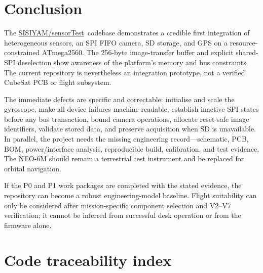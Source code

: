 \documentclass[11pt,a4paper]{article}
\newcommand{\repo}{\href{https://github.com/SISIYAM/sensorTest}{SISIYAM/sensorTest}}
\begin{document}
\section{Conclusion}

The \repo\ codebase demonstrates a credible first integration of heterogeneous sensors, an SPI FIFO camera, SD storage, and GPS on a resource-constrained ATmega2560. The 256-byte image-transfer buffer and explicit shared-SPI deselection show awareness of the platform's memory and bus constraints. The current repository is nevertheless an integration prototype, not a verified CubeSat PCB or flight subsystem.

The immediate defects are specific and correctable: initialise and scale the gyroscope, make all device failures machine-readable, establish inactive SPI states before any bus transaction, bound camera operations, allocate reset-safe image identifiers, validate stored data, and preserve acquisition when SD is unavailable. In parallel, the project needs the missing engineering record---schematic, PCB, BOM, power/interface analysis, reproducible build, calibration, and test evidence. The NEO-6M should remain a terrestrial test instrument and be replaced for orbital navigation.

If the P0 and P1 work packages are completed with the stated evidence, the repository can become a robust engineering-model baseline. Flight suitability can only be considered after mission-specific component selection and V2--V7 verification; it cannot be inferred from successful desk operation or from the firmware alone.

\clearpage
\appendix
\section{Code traceability index}
\end{document}
